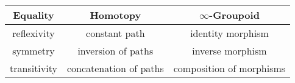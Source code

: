 \documentclass[hott-all.tex]{subfiles}
\begin{document}
\begin{center}
  \medskip
  \begin{tabular}{ccc}
    \toprule
    Equality & Homotopy & $\infty$-Groupoid\\
    \midrule
    reflexivity\index{equality!reflexivity of} & constant path & identity morphism\\
    symmetry\index{equality!symmetry of} & inversion of paths & inverse morphism\\
    transitivity\index{equality!transitivity of} & concatenation of paths & composition of morphisms\\
    \bottomrule
  \end{tabular}
  \medskip
\end{center}
\end{document}
